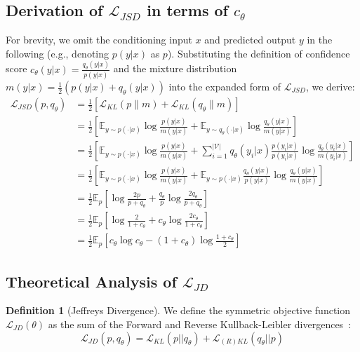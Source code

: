 \documentclass{article}
\theoremstyle{plain}
\theoremstyle{definition}
\newtheorem{definition}[theorem]{Definition}
\theoremstyle{remark}
\begin{document}
\subsection{Derivation of $\mathcal{L}_{JSD}$ in terms of $c_\theta$} \label{app:sec:JSD_derivation}

For brevity, we omit the conditioning input $x$ and predicted output $y$ in the following (e.g., denoting $p(y|x)$ as $p$).
Substituting the definition of confidence score $c_\theta (y|x) = \frac{q_\theta(y|x)}{p(y|x)}$ and the mixture distribution $m(y|x) = \frac{1}{2}(p(y|x) + q_\theta (y|x))$ into the expanded form of $\mathcal{L}_{JSD}$, we derive:
\begin{align}
\mathcal{L}_{JSD}(p,q_\theta) &= \frac{1}{2} \left[ \mathcal{L}_{KL}(p \| m) + \mathcal{L}_{KL}(q_\theta \| m) \right] \\
&= \frac{1}{2} \left[ \mathbb{E}_{y \sim p(\cdot|x)} \log \frac{p(y|x)}{m(y|x)}   +  \mathbb{E}_{y \sim q_\theta(\cdot|x)} \log \frac{q_\theta (y|x)}{m(y|x)} \right] \\
&= \frac{1}{2} \left[ \mathbb{E}_{y \sim p(\cdot|x)} \log \frac{p(y|x)}{m(y|x)}   + \sum_{i=1}^{|\mathcal{V}|} q_\theta (y_i|x) \frac{p (y_i|x)}{p (y_i|x)} \log \frac{q_\theta (y_i|x)}{m(y_i|x)} \right] \\
&= \frac{1}{2} \left[ \mathbb{E}_{y \sim p(\cdot|x)} \log \frac{p(y|x)}{m(y|x)}   +  \mathbb{E}_{y \sim p(\cdot|x)} \frac{q_\theta (y|x)}{p(y|x)} \log \frac{q_\theta (y|x)}{m(y|x)} \right] \\
&= \frac{1}{2} \mathbb{E}_{p} \left[ \log \frac{2p}{p+q_\theta} +  \frac{q_\theta}{p} \log \frac{2q_\theta}{p+q_\theta} \right] \\
&= \frac{1}{2} \mathbb{E}_{p} \left[ \log \frac{2}{1+c_\theta} + c_\theta \log \frac{2c_\theta}{1+c_\theta} \right] \\
&= \frac{1}{2} \mathbb{E}_{p} \left[ c_\theta \log c_\theta - (1+c_\theta) \log \frac{1+c_\theta}{2} \right]
\end{align}

\subsection{Theoretical Analysis of $\mathcal{L}_{JD}$} \label{sec:JD_derivation}

\begin{definition}[Jeffreys Divergence]
We define the symmetric objective function $\mathcal{L}_{JD}(\theta)$ as the sum of the Forward and Reverse Kullback-Leibler divergences~\cite{jeffreys1948theory}:
\begin{equation}\label{eq:jd}
    \mathcal{L}_{JD}(p,q_\theta) = \mathcal{L}_{KL}(p || q_{\theta}) + \mathcal{L}_{(R)KL}(q_{\theta} || p)
\end{equation}
\end{definition}
\end{document}
